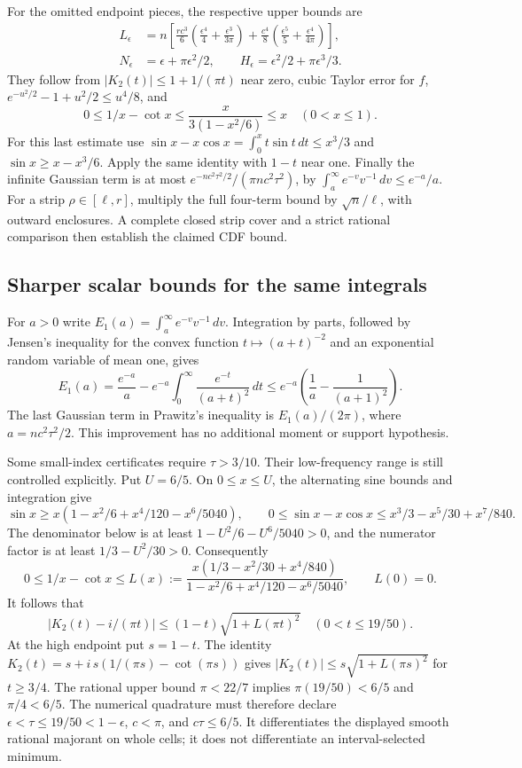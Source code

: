 For the omitted endpoint pieces, the respective upper bounds are
\begin{align*}
 L_\epsilon&=n\left[
 \frac{rc^3}{6}\left(\frac{\epsilon^4}{4}
       +\frac{\epsilon^3}{3\pi}\right)
 +\frac{c^4}{8}\left(\frac{\epsilon^5}{5}
       +\frac{\epsilon^4}{4\pi}\right)\right],\\
 N_\epsilon&=\epsilon+\pi\epsilon^2/2,\qquad
 H_\epsilon=\epsilon^2/2+\pi\epsilon^3/3.
\end{align*}
They follow from $|K_2(t)|\le1+1/(\pi t)$ near zero, cubic Taylor
error for $f$, $e^{-u^2/2}-1+u^2/2\le u^4/8$, and
\[
 0\le1/x-\cot x\le\frac{x}{3(1-x^2/6)}\le x\quad(0<x\le1).
\]
For this last estimate use
$\sin x-x\cos x=\int_0^x t\sin t\,dt\le x^3/3$ and
$\sin x\ge x-x^3/6$. Apply the same identity with $1-t$ near one.
Finally the infinite Gaussian term is at most
$e^{-nc^2\tau^2/2}/(\pi nc^2\tau^2)$, by
$\int_a^\infty e^{-v}v^{-1}\,dv\le e^{-a}/a$.
For a strip $\rho\in[\ell,r]$, multiply the full four-term bound by
$\sqrt n/\ell$, with outward enclosures. A complete closed strip cover
and a strict rational comparison then establish the claimed CDF bound.


\subsection{Sharper scalar bounds for the same integrals}
\label{j:fourier:quadrature}
For $a>0$ write $E_1(a)=\int_a^\infty e^{-v}v^{-1}\,dv$.
Integration by parts, followed by Jensen's inequality for the convex
function $t\mapsto(a+t)^{-2}$ and an exponential random variable of mean
one, gives
\[
 E_1(a)=\frac{e^{-a}}a-e^{-a}\int_0^\infty
                \frac{e^{-t}}{(a+t)^2}\,dt
 \le e^{-a}\left(\frac1a-\frac1{(a+1)^2}\right).
\]
The last Gaussian term in Prawitz's inequality is $E_1(a)/(2\pi)$,
where $a=nc^2\tau^2/2$. This improvement has no additional moment or
support hypothesis.

Some small-index certificates require $\tau>3/10$. Their low-frequency
range is still controlled explicitly. Put $U=6/5$. On $0\le x\le U$,
the alternating sine bounds and integration give
\[
 \sin x\ge x\left(1-x^2/6+x^4/120-x^6/5040\right),\qquad
 0\le\sin x-x\cos x\le x^3/3-x^5/30+x^7/840.
\]
The denominator below is at least $1-U^2/6-U^6/5040>0$, and the
numerator factor is at least $1/3-U^2/30>0$. Consequently
\[
 0\le1/x-\cot x\le L(x):=
 \frac{x(1/3-x^2/30+x^4/840)}
      {1-x^2/6+x^4/120-x^6/5040},
 \qquad L(0)=0.
\]
It follows that
\[
 |K_2(t)-i/(\pi t)|
 \le(1-t)\sqrt{1+L(\pi t)^2}
 \quad(0<t\le19/50).
\]
At the high endpoint put $s=1-t$. The identity
$K_2(t)=s+i\,s(1/(\pi s)-\cot(\pi s))$ gives
$|K_2(t)|\le s\sqrt{1+L(\pi s)^2}$ for $t\ge3/4$.
The rational upper bound $\pi<22/7$ implies
$\pi(19/50)<6/5$ and $\pi/4<6/5$.
The numerical quadrature must therefore declare
$\epsilon<\tau\le19/50<1-\epsilon$, $c<\pi$, and $c\tau\le6/5$.
It differentiates the displayed smooth rational majorant on whole cells;
it does not differentiate an interval-selected minimum.

